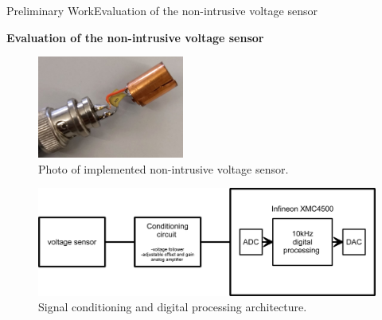 \begin{frame}{Preliminary Work}{Evaluation of the non-intrusive voltage sensor}
\begin{block}{\textbf{Evaluation of the non-intrusive voltage sensor}}
	
		\begin{minipage}[t]{0.51\linewidth}
		
		\begin{figure}[ht!]
			\centering
				\includegraphics[width=0.43\textwidth,keepaspectratio]{figures/50.PreliminaryW/voltage_sensor}
			\caption{Photo of implemented non-intrusive voltage sensor.}
		\end{figure}
	\end{minipage}\hfill
	\begin{minipage}[t]{0.48\linewidth}
		
		
		\begin{figure}[ht!]
			\centering
			\includegraphics[width=1\textwidth,keepaspectratio]{figures/50.PreliminaryW/generalArchitecture}
			\caption{Signal conditioning and digital processing architecture.}
		\end{figure}
		
		
		
	\end{minipage}
	
	
	
\end{block}
\end{frame}

